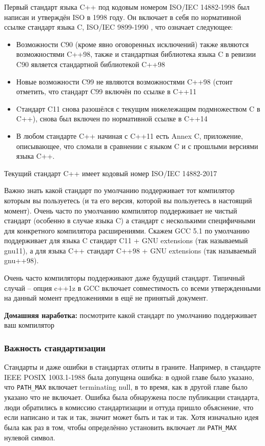 \documentclass[a4paper,12pt,oneside]{article}
\begin{document}
Первый стандарт языка C++ под кодовым номером ISO/IEC 14882-1998 \cite{stdcpp98} был написан и утверждён ISO в 1998 году. Он включает в себя по нормативной ссылке стандарт языка C, ISO/IEC 9899-1990 \cite{stdc90}, что означает следующее: 

\begin{itemize}
\item
Возможности C90 (кроме явно оговоренных исключений) также являются возможностями C++98, также и стандартная библиотека языка C в ревизии C90 является стандартной библиотекой C++98
\item
Новые возможности C99 \cite{stdc90} не являются возможностями C++98 (стоит отметить, что стандарт C99 включён по ссылке в C++11 \cite{stdcpp11}
\item
Cтандарт C11 \cite{stdc11} снова разошёлся с текущим нижележащим подмножеством C в C++), снова был включен по нормативной ссылке в C++14 \cite{stdcpp14}
\item
В любом стандарте C++ начиная с C++11 есть Annex C, приложение, описывающее, что сломали в сравнении с языком C и с прошлыми версиями языка C++.
\end{itemize}

Текущий стандарт C++ имеет кодовый номер ISO/IEC 14882-2017

Важно знать какой стандарт по умолчанию поддерживает тот компилятор которым вы пользуетесь (и та его версия, которой вы пользуетесь в настоящий момент). Очень часто по умолчанию компилятор поддерживает не чистый стандарт (особенно в случае языка C) а стандарт с несколькими специфичными для конкретного компилятора расширениями. Скажем GCC 5.1 по умолчанию поддерживает для языка C стандарт C11 + GNU extensions (так называемый gnu11), а для языка C++ стандарт C++98 + GNU extensions (так называемый gnu++98).

Очень часто компиляторы поддерживают даже будущий стандарт. Типичный случай -- опция c++1z в GCC включает совместимость со всеми утвержденными на данный момент предложениями в ещё не принятый документ.

\textbf{Домашняя наработка:} посмотрите какой стандарт по умолчанию поддерживает ваш компилятор

\subsubsection{Важность стандартизации}\label{StandartizationImportance}

Стандарты и даже ошибки в стандартах отлиты в граните. Например, в стандарте IEEE POSIX 1003.1-1988 была допущена ошибка: в одной главе было указано, что \lstinline!PATH_MAX! включает terminating null, в то время, как в другой главе было указано что не включает. Ошибка была обнаружена после публикации стандарта, люди обратились в комиссию стандартизации и оттуда пришло объяснение, что если написано и так и так, значит может быть и так и так. Хотя изначально идея была как раз в том, чтобы определённо установить включает ли \lstinline!PATH_MAX! нулевой символ.
\end{document}
